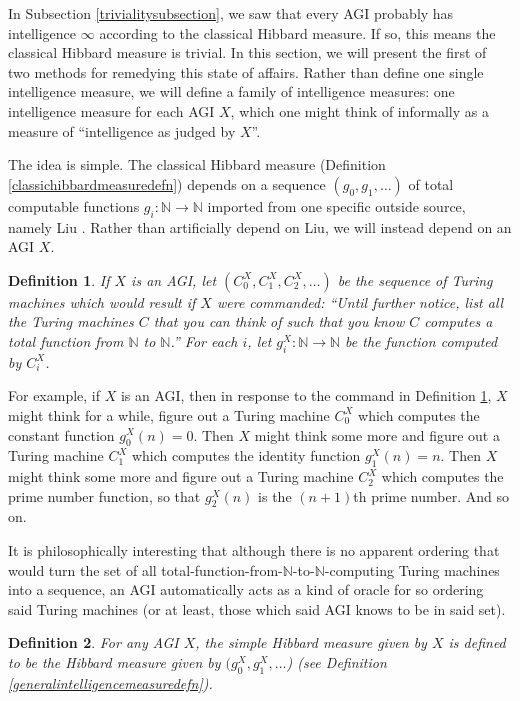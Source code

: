 \documentclass{article}
\newtheorem{definition}{Definition}
\begin{document}
In Subsection \ref{trivialitysubsection}, we saw that every AGI probably has
intelligence $\infty$ according to the classical Hibbard measure. If so, this
means the classical Hibbard measure is trivial. In this section, we will present
the first of two methods for remedying this state of affairs. Rather than define
one single intelligence measure, we will define a family of intelligence measures:
one intelligence measure for each AGI $X$, which one might think of informally as
a measure of ``intelligence as judged by $X$''.

The idea is simple. The classical Hibbard measure
(Definition \ref{classichibbardmeasuredefn}) depends on a sequence $(g_0,g_1,\ldots)$
of total computable functions $g_i:\mathbb N\to\mathbb N$ imported from one specific
outside source, namely Liu \cite{liu1960enumeration}. Rather than artificially depend
on Liu, we will instead depend on an AGI $X$.

\begin{definition}
\label{functionlistdefinition}
    If $X$ is an AGI, let $(C^X_0, C^X_1, C^X_2, \ldots)$ be the sequence of
    Turing machines which would result if $X$ were commanded: ``Until further
    notice, list all the Turing machines $C$ that you can think of such that
    you know $C$ computes a total function from $\mathbb N$ to $\mathbb N$.''
    For each $i$, let $g^X_i:\mathbb N\to\mathbb N$ be the function computed by
    $C^X_i$.
\end{definition}

For example, if $X$ is an AGI, then in response to the command in Definition
\ref{functionlistdefinition}, $X$ might think for a while, figure out a Turing
machine $C^X_0$ which computes the constant function $g^X_0(n)=0$. Then $X$
might think some more and figure out a Turing machine $C^X_1$ which computes
the identity function $g^X_1(n)=n$. Then $X$ might think some more and figure
out a Turing machine $C^X_2$ which computes the prime number function, so that
$g^X_2(n)$ is the $(n+1)$th prime number. And so on.

It is philosophically interesting that although there is no apparent ordering that
would turn the set of all total-function-from-$\mathbb N$-to-$\mathbb N$-computing
Turing machines into a sequence, an AGI automatically acts as a kind of oracle for
so ordering said Turing machines (or at least, those which said AGI knows to be in
said set).

\begin{definition}
    For any AGI $X$, the \emph{simple Hibbard measure given by $X$}
    is defined to be the Hibbard measure given by
    $(g^X_0,g^X_1,\ldots$) (see Definition \ref{generalintelligencemeasuredefn}).
\end{definition}




\end{document}

